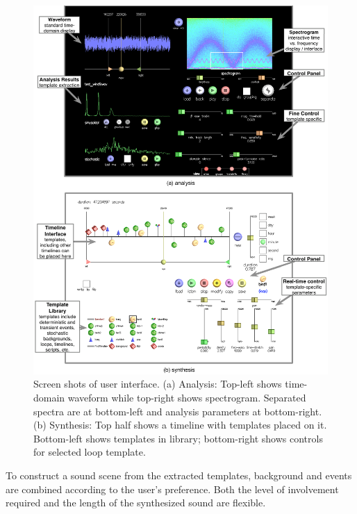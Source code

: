 \documentclass[review]{acmsiggraph}      %
\begin{document}
\begin{figure}[t]
\centering
\includegraphics[width=.83\textwidth]{ui2.eps}
\caption{Screen shots of user interface. (a) Analysis: Top-left shows time-domain waveform 
while top-right shows spectrogram. Separated spectra are at bottom-left 
and analysis parameters at bottom-right. (b) Synthesis: Top half shows a timeline with 
templates placed on it. Bottom-left shows templates in library; bottom-right shows controls 
for selected loop template.} \clearpage \label{fig:ui}
\end{figure}



To construct a sound scene from the extracted templates, background and events are combined 
according to the user's preference. Both the level of involvement required and the 
length of the synthesized sound are flexible. 
\end{document}
